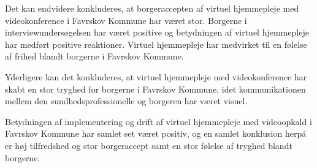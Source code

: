 Det kan endvidere konkluderes, at borgeraccepten af virtuel hjemmepleje med videokonference i Favrskov Kommune har været stor. Borgerne i interviewundersøgelsen har været positive og betydningen af virtuel hjemmepleje har medført positive reaktioner. Virtuel hjemmepleje har medvirket til en følelse af frihed blandt borgerne i Favrskov Kommune.

Yderligere kan det konkluderes, at virtuel hjemmepleje med videokonference har skabt en stor tryghed for borgerne i Favrskov Kommune, idet kommunikationen mellem den sundhedsprofessionelle og borgeren har været visuel. 

Betydningen af implementering og drift af virtuel hjemmepleje med videoopkald i Favrskov Kommune har samlet set været positiv, og en samlet konklusion herpå er høj tilfredshed og stor borgeraccept samt en stor følelse af tryghed blandt borgerne. 












